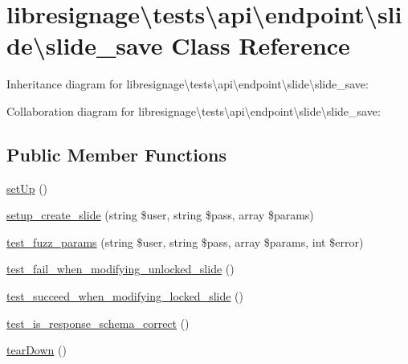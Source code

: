 \hypertarget{classlibresignage_1_1tests_1_1api_1_1endpoint_1_1slide_1_1slide__save}{}\section{libresignage\textbackslash{}tests\textbackslash{}api\textbackslash{}endpoint\textbackslash{}slide\textbackslash{}slide\+\_\+save Class Reference}
\label{classlibresignage_1_1tests_1_1api_1_1endpoint_1_1slide_1_1slide__save}


Inheritance diagram for libresignage\textbackslash{}tests\textbackslash{}api\textbackslash{}endpoint\textbackslash{}slide\textbackslash{}slide\+\_\+save\+:


Collaboration diagram for libresignage\textbackslash{}tests\textbackslash{}api\textbackslash{}endpoint\textbackslash{}slide\textbackslash{}slide\+\_\+save\+:
\subsection*{Public Member Functions}
\begin{DoxyCompactItemize}
\item 
\hyperlink{classlibresignage_1_1tests_1_1api_1_1endpoint_1_1slide_1_1slide__save_ab0e02b6edbcd040e1d86c8eab03db308}{set\+Up} ()
\item 
\hyperlink{classlibresignage_1_1tests_1_1api_1_1endpoint_1_1slide_1_1slide__save_ab8bc0d5c43de5fb0bae70ab924e0fa46}{setup\+\_\+create\+\_\+slide} (string \$user, string \$pass, array \$params)
\item 
\hyperlink{classlibresignage_1_1tests_1_1api_1_1endpoint_1_1slide_1_1slide__save_afb14f023746183160ae76d0af51b7516}{test\+\_\+fuzz\+\_\+params} (string \$user, string \$pass, array \$params, int \$error)
\item 
\hyperlink{classlibresignage_1_1tests_1_1api_1_1endpoint_1_1slide_1_1slide__save_a1d2435a00f0bb9a7db92d2a43f60b565}{test\+\_\+fail\+\_\+when\+\_\+modifying\+\_\+unlocked\+\_\+slide} ()
\item 
\hyperlink{classlibresignage_1_1tests_1_1api_1_1endpoint_1_1slide_1_1slide__save_aa1f77ee6029d1f40faa8034e41a125db}{test\+\_\+succeed\+\_\+when\+\_\+modifying\+\_\+locked\+\_\+slide} ()
\item 
\hyperlink{classlibresignage_1_1tests_1_1api_1_1endpoint_1_1slide_1_1slide__save_a89eadea2851c0fcb7e403436bbe77661}{test\+\_\+is\+\_\+response\+\_\+schema\+\_\+correct} ()
\item 
\hyperlink{classlibresignage_1_1tests_1_1api_1_1endpoint_1_1slide_1_1slide__save_a3822c9b170d420ef6cc5e166fb6dde66}{tear\+Down} ()
\end{DoxyCompactItemize}
